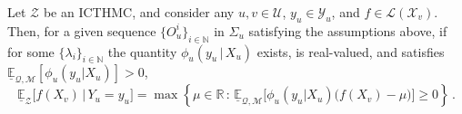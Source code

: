 \documentclass[twoside,11pt]{article}
\newcommand{\nats}{\mathbb{N}}
\newcommand{\reals}{\mathbb{R}}
\newcommand{\states}{\mathcal{X}}
\newcommand{\observs}{\mathcal{Y}}
\newcommand{\lexp}{\underline{\mathbb{E}}_{\rateset,\mathcal{M}}}
\newcommand{\gambles}{\mathcal{L}}
\newcommand{\rateset}{\mathcal{Q}}
\newcommand{\coloneqq}{:\!=}
\begin{document}
\begin{proposition}\label{prop:GBR_for_densities_lower_zero}
Let $\mathcal{Z}$ be an ICTHMC, and consider any $u,v\in\mathcal{U}$, $y_u\in\observs_u$, and $f\in\gambles(\states_v)$. Then, for a given sequence $\{O_u^i\}_{i\in\nats}$ in $\Sigma_u$ satisfying the assumptions above, if for some $\{\lambda_i\}_{i\in\nats}$ the quantity $\phi_u(y_u\,\vert\,X_u)$ exists, is real-valued, and satisfies $\lexp[\phi_u(y_u\vert X_u)]>0$,
\begin{equation*}
\underline{\mathbb{E}}_{\mathcal{Z}}\bigl[f(X_v)\,\vert\,Y_u = y_u\bigr] = \max\left\{\mu\in\reals\,:\, \lexp\bigl[\phi_u(y_u\vert X_u)\bigl(f(X_v) - \mu\bigr)\bigr] \geq 0\right\}\,.
\end{equation*}
\end{proposition}
%

\end{document}
